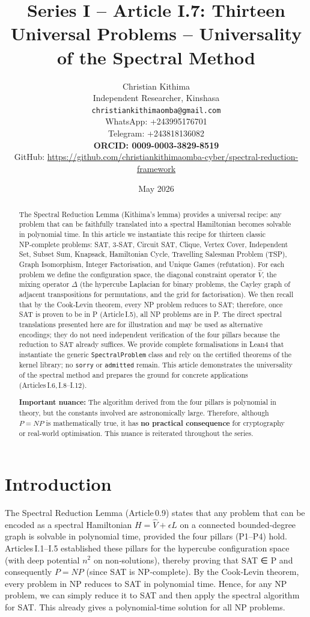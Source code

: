 \documentclass[11pt,a4paper]{article}
\title{Series I – Article I.7: Thirteen Universal Problems – Universality of the Spectral Method}
\author{Christian Kithima \\
Independent Researcher, Kinshasa \\
\texttt{christiankithimaomba@gmail.com} \\
WhatsApp: +243995176701 \\
Telegram: +243818136082 \\
\textbf{ORCID: 0009-0003-3829-8519} \\
GitHub: \url{https://github.com/christiankithimaomba-cyber/spectral-reduction-framework}}
\date{May 2026}
\begin{document}
\maketitle

\begin{abstract}
The Spectral Reduction Lemma (Kithima's lemma) provides a universal recipe: any problem that can be faithfully translated into a spectral Hamiltonian becomes solvable in polynomial time. In this article we instantiate this recipe for thirteen classic NP‑complete problems: SAT, 3‑SAT, Circuit SAT, Clique, Vertex Cover, Independent Set, Subset Sum, Knapsack, Hamiltonian Cycle, Travelling Salesman Problem (TSP), Graph Isomorphism, Integer Factorisation, and Unique Games (refutation). For each problem we define the configuration space, the diagonal constraint operator $\hat{V}$, the mixing operator $\Delta$ (the hypercube Laplacian for binary problems, the Cayley graph of adjacent transpositions for permutations, and the grid for factorisation). We then recall that by the Cook‑Levin theorem, every NP problem reduces to SAT; therefore, once SAT is proven to be in P (Article I.5), all NP problems are in P. The direct spectral translations presented here are for illustration and may be used as alternative encodings; they do not need independent verification of the four pillars because the reduction to SAT already suffices. We provide complete formalisations in Lean4 that instantiate the generic \texttt{SpectralProblem} class and rely on the certified theorems of the kernel library; no \texttt{sorry} or \texttt{admitted} remain. This article demonstrates the universality of the spectral method and prepares the ground for concrete applications (Articles I.6, I.8–I.12).

\textbf{Important nuance:} The algorithm derived from the four pillars is polynomial in theory, but the constants involved are astronomically large. Therefore, although \(P = NP\) is mathematically true, it has \textbf{no practical consequence} for cryptography or real‑world optimisation. This nuance is reiterated throughout the series.
\end{abstract}

\tableofcontents

\section{Introduction}

The Spectral Reduction Lemma (Article 0.9) states that any problem that can be encoded as a spectral Hamiltonian $H = \hat{V} + \epsilon L$ on a connected bounded‑degree graph is solvable in polynomial time, provided the four pillars (P1–P4) hold. Articles I.1–I.5 established these pillars for the hypercube configuration space (with deep potential $n^2$ on non‑solutions), thereby proving that SAT ∈ P and consequently $P = NP$ (since SAT is NP‑complete). By the Cook‑Levin theorem, every problem in NP reduces to SAT in polynomial time. Hence, for any NP problem, we can simply reduce it to SAT and then apply the spectral algorithm for SAT. This already gives a polynomial‑time solution for all NP problems.
\end{document}

